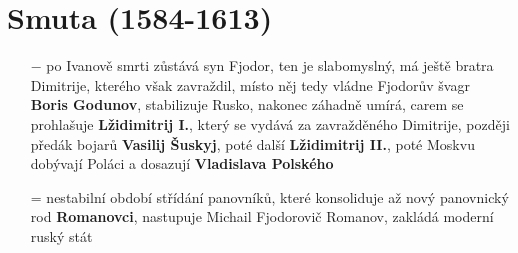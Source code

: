 \documentclass{article}
\begin{document}
\section*{Smuta (1584-1613)}
\begin{itemize}
    \vspace{-0.5em}
    \setlength\itemsep{0.15em}
    \item[$-$] po Ivanově smrti zůstává syn Fjodor, ten je slabomyslný, má ještě bratra Dimitrije, kterého však zavraždil, místo něj tedy vládne Fjodorův švagr \textbf{Boris Godunov}, stabilizuje Rusko, nakonec záhadně umírá, carem se prohlašuje \textbf{Lžidimitrij I.}, který se vydává za zavražděného Dimitrije, později předák bojarů \textbf{Vasilij Šuskyj}, poté další \textbf{Lžidimitrij II.}, poté Moskvu dobývají Poláci a dosazují \textbf{Vladislava Polského}
    \item[=] nestabilní období střídání panovníků, které konsoliduje až nový panovnický rod \textbf{Romanovci}, nastupuje Michail Fjodorovič Romanov, zakládá moderní ruský stát
\end{itemize}
\end{document}
